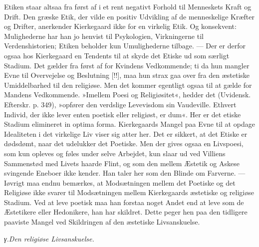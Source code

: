 \documentclass[12pt,a4paper,openany]{book}
\newcommand{\opage}[1]{\marginnote{\footnotesize\textit{[#1]}}}
\begin{document}
Etiken staar altsaa fra først af i et rent negativt
Forhold til Menneskets Kraft og Drift. Den græske Etik,
der vilde en positiv Udvikling af de menneskelige Kræfter
og Drifter, anerkender Kierkegaard ikke for en virkelig
Etik. Og konsekvent: Mulighederne har han jo henvist
til Psykologien, Virkningerne til Verdenshistorien; Etiken
beholder kun Umulighederne tilbage. --- Der er derfor ogsaa
hos Kierkegaard en Tendents til at skyde det Etiske ud
som særligt Stadium. Det gælder fra først af for Kvindens
Vedkommende; ti da hun mangler Evne til Overvejelse
og Beslutning [!!], maa hun strax gaa over fra den
æstetiske Umiddelbarhed til den religiøse. Men det kommer
egentligt ogsaa til at gælde for Mandens Vedkommende.
»Imellem Poesi og Religiøsitet«, hedder det (Uvidensk.
Efterskr. p. 349), »opfører den verdslige Levevisdom
sin Vaudeville. Ethvert Individ, der ikke lever
enten poetisk eller religiøst, er dum«. Her er det etiske
\opage{109}Stadium elimineret in optima forma. Kierkegaards Mangel
paa Evne til at opdage Idealiteten i det virkelige Liv
viser sig atter her. Det er sikkert, at det Etiske er
dødsdømt, naar det udelukker det Poetiske. Men der
gives ogsaa en Livspoesi, som kun opleves og føles under
selve Arbejdet, kun slaar ud ved Villiens Sammenstød
med Livets haarde Flint, og som den mellem Æstetik og
Askese svingende Eneboer ikke kender. Han taler her
som den Blinde om Farverne. --- Iøvrigt maa endnu bemærkes,
at Modsætningen mellem det Poetiske og det
Religiøse ikke svarer til Modsætningen mellem Kierkegaards
æstetiske og religiøse Stadium. Ved at leve
poetisk maa han forstaa noget Andet end at leve som de
Æstetikere eller Hedonikere, han har skildret. Dette
peger hen paa den tidligere paaviste Mangel ved Skildringen
af den æstetiske Livsanskuelse.

\begin{center}\textit{γ.\enspace Den religiøse Livsanskuelse.}\end{center}
\end{document}
